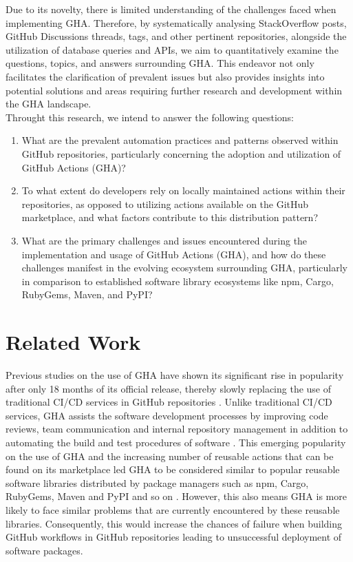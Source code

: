 \documentclass[conference]{IEEEtran}
\begin{document}
Due to its novelty, there is limited understanding of the challenges faced when implementing GHA.  
Therefore,  by systematically analysing StackOverflow posts, GitHub Discussions threads, tags, and other pertinent repositories, alongside the utilization of database queries and APIs, we aim to quantitatively examine the questions, topics, and answers surrounding GHA. This endeavor not only facilitates the clarification of prevalent issues but also provides insights into potential solutions and areas requiring further research and development within the GHA landscape.\\
Throught this research, we intend to answer the following questions:

\begin{enumerate}
    \item What are the prevalent automation practices and patterns observed within GitHub repositories, particularly concerning the adoption and utilization of GitHub Actions (GHA)?
    
    \item To what extent do developers rely on locally maintained actions within their repositories, as opposed to utilizing actions available on the GitHub marketplace, and what factors contribute to this distribution pattern?
    
    \item What are the primary challenges and issues encountered during the implementation and usage of GitHub Actions (GHA), and how do these challenges manifest in the evolving ecosystem surrounding GHA, particularly in comparison to established software library ecosystems like npm, Cargo, RubyGems, Maven, and PyPI?
\end{enumerate}

\section{Related Work}
Previous studies on the use of GHA have shown its significant rise in popularity after only 18 months of its official release, thereby slowly replacing the use of traditional CI/CD services in GitHub repositories \cite{b15}. Unlike traditional CI/CD services, GHA assists the software development processes by improving code reviews, team communication and internal repository management in addition to automating the build and test procedures of software \cite{b16}. This emerging popularity on the use of GHA and the increasing number of reusable actions that can be found on its marketplace led GHA to be considered similar to popular reusable software libraries distributed by package managers such as npm, Cargo, RubyGems, Maven and PyPI and so on \cite{b4}. However, this also means GHA is more likely to face similar problems that are currently encountered by these reusable libraries. Consequently, this would increase the chances of failure when building GitHub workflows in GitHub repositories leading to unsuccessful deployment of software packages. 
\end{document}
